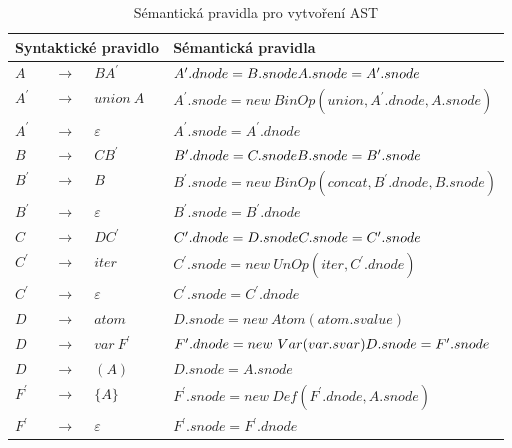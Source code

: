 \documentclass[thesis=B,czech]{FITthesis}[2019/12/23]
\theoremstyle{definition}
\begin{document}
\begin{table}
\begin{center}
 \begin{tabular}{|lcl|p{90mm}|} 
\hline
\multicolumn{3}{|p{30mm}|}{\textbf{Syntaktické \newline pravidlo}}&\multicolumn{1}{|l|}{\textbf{Sémantická pravidla}} \\
\hline\hline
$A$  &  $\rightarrow$ & $B A^\prime$ & $A^\prime.dnode=B.snode \newline A.snode= A^\prime.snode$ \\  
\hline
$A^\prime$ & $\rightarrow$ & $union \ A$ & $A^\prime.snode=new \ BinOp(union, A^\prime.dnode, A.snode)$\\ 
\hline
$A^\prime$ & $\rightarrow$ & $\varepsilon$ & $A^\prime.snode=A^\prime.dnode$\\
\hline
$B$ & $\rightarrow$ & $C B^\prime$ &  $B^\prime.dnode=C.snode \newline  B.snode= B^\prime.snode$ \\
\hline
$B^\prime$ &$\rightarrow$ & $B$ &  $B^\prime.snode=new \ BinOp(concat, B^\prime.dnode, B.snode)$\\
\hline
$B^\prime$ & $\rightarrow$ & $\varepsilon$ &$B^\prime.snode=B^\prime.dnode$\\
\hline
$C $&$\rightarrow$& $D C^\prime$ & $C^\prime.dnode=D.snode \newline C.snode= C^\prime.snode$\\
\hline
$C^\prime$ &$\rightarrow$& $iter$ & $C^\prime.snode=new \ UnOp(iter, C^\prime.dnode)$\\
\hline
$C^\prime$ &$\rightarrow $&$\varepsilon$ &$C^\prime.snode= C^\prime.dnode$ \\
\hline
$D$ &$\rightarrow$ &$atom$ & $D.snode=new \ Atom(atom.svalue)$\\
\hline
$D$ & $\rightarrow$&$ var \ F^\prime$ & $F^\prime.dnode=new \ Var(var.svar) \newline  D.snode=F^\prime.snode$\\
\hline
$D$ & $\rightarrow$ &$\left( A \right)$& $D.snode=A.snode$ \\
\hline
$F^\prime$ & $\rightarrow$&$ \{ A \}$ & $F^\prime.snode = new \ Def(F^\prime.dnode, A.snode)$ \\
\hline
$F^\prime$ & $\rightarrow$& $\varepsilon$ & $F^\prime.snode = F^\prime.dnode$ \\
\hline

\end{tabular}
\end{center}
\caption{\label{tab:sem} Sémantická pravidla pro vytvoření AST}
\end{table}
  
\end{document}
